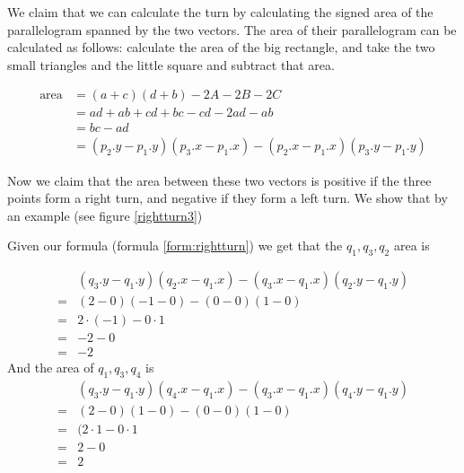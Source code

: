 We claim that we can calculate the turn by calculating the signed area of the
parallelogram spanned by the two vectors. The area of their parallelogram can
be calculated as follows: calculate the area of the big rectangle, and take the
two small triangles and the little square and subtract that area.

\begin{align}
	\text{area} &= (a+c)(d+b)-2A-2B-2C\nonumber\\
							&=ad+ab+cd+bc-cd-2ad-ab\nonumber\\
							&=bc-ad \nonumber\\
							&=(p_2.y-p_1.y)(p_3.x-p_1.x)-(p_2.x-p_1.x)(p_3.y-p_1.y)\label{form:rightturn}
\end{align}

Now we claim that the area between these two vectors is positive if the
three points form a right turn, and negative if they form a left turn. We show
that by an example (see figure \ref{rightturn3})

Given our formula (formula \ref{form:rightturn}) we get that the $q_1,q_3,q_2$ area is

\begin{align*}
	&(q_3.y-q_1.y)(q_2.x-q_1.x)-(q_3.x-q_1.x)(q_2.y-q_1.y)\\ 
	= &(2-0)(-1-0)-(0-0)(1-0)\\
	= & 2\cdot (-1)-0\cdot1\\
	= & -2-0\\
	= & -2
\end{align*}
And the area of $q_1,q_3,q_4$ is
\begin{align*}
	&(q_3.y-q_1.y)(q_4.x-q_1.x)-(q_3.x-q_1.x)(q_4.y-q_1.y)\\ 
	= &(2-0)(1-0)-(0-0)(1-0)\\
	= &(2\cdot 1 - 0\cdot 1\\
	= &2-0\\
	= &2
\end{align*}

